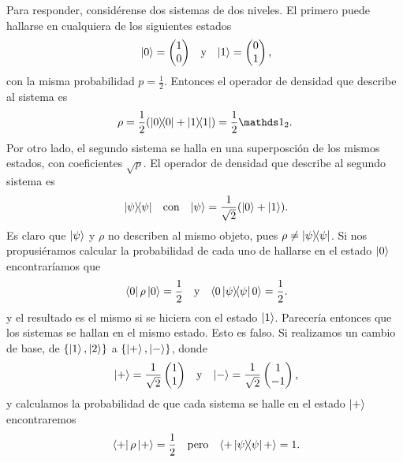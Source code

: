 Para responder, considérense dos sistemas de dos niveles. El primero puede hallarse en cualquiera de los siguientes estados
\begin{align*}
    \ket{0}=\begin{pmatrix}
        1\\
        0
    \end{pmatrix} && \text{y} && \ket{1}=\begin{pmatrix}
        0\\
        1
    \end{pmatrix}\rlap{,}
\end{align*}
con la misma probabilidad $p=\frac{1}{2}$. Entonces el operador de densidad que describe al sistema es 
\begin{equation*}
    \rho=\frac{1}{2}(\dyad{0}+\dyad{1})=\frac{1}{2}\Id_{2}.
\end{equation*}
Por otro lado, el segundo sistema se halla en una superposción de los mismos estados, con coeficientes $\sqrt{p}$. El operador de densidad que describe al segundo sistema es 
\begin{align*}
    \dyad{\psi} && \text{con} && \ket{\psi}=\frac{1}{\sqrt{2}}(\ket{0}+\ket{1})\rlap{.}
\end{align*}
Es claro que $\ket{\psi}$ y $\rho$ no describen al mismo objeto, pues $\rho\neq\dyad{\psi}$. Si nos propusiéramos calcular la probabilidad de cada uno de hallarse en el estado $\ket{0}$ encontraríamos que
\begin{align*}
    \bra{0}\rho\ket{0}=\frac{1}{2} && \text{y} &&\langle 0 \dyad{\psi} 0\rangle=\frac{1}{2}\rlap{.}
\end{align*}
y el resultado es el mismo si se hiciera con el estado $\ket{1}$. Parecería entonces que los sistemas se hallan en el mismo estado. Esto es falso. Si realizamos un cambio de base, de $\{\ket{1},\ket{2}\}$ a $\{\ket{+},\ket{-}\}$, donde
\begin{align*}
    \ket{+}=\frac{1}{\sqrt{2}}\begin{pmatrix}
        1\\
        1
    \end{pmatrix} && \text{y} && \ket{-}=\frac{1}{\sqrt{2}}\begin{pmatrix}
        1\\
        -1
    \end{pmatrix}\rlap{,}
\end{align*}
y calculamos la probabilidad de que cada sistema se halle en el estado $\ket{+}$ encontraremos
\begin{align*}
    \bra{+}\rho\ket{+}=\frac{1}{2} && \text{pero} &&\langle + \dyad{\psi} +\rangle=1\rlap{.}
\end{align*}
